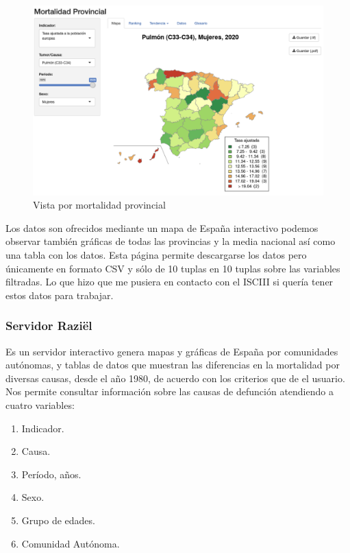 \begin{figure}[]
	\centering
	\includegraphics[scale=0.5]{doc/logos/imgs/ariadna2.png}
	\caption{ \cite{ariadna} Vista por mortalidad provincial }
    \label{fig:worst_f_value}
\end{figure}

Los datos son ofrecidos mediante un mapa de España interactivo podemos observar también gráficas de todas las
provincias y la media nacional así como una tabla con los datos. Esta página permite descargarse los datos pero
únicamente en formato CSV y sólo de 10 tuplas en 10 tuplas sobre las variables filtradas. Lo que hizo que me pusiera en 
contacto con el ISCIII si quería tener estos datos para trabajar.

\subsubsection{Servidor Raziël}
Es un servidor interactivo genera mapas y gráficas de España por comunidades autónomas, y tablas de datos que muestran 
las diferencias en la mortalidad por diversas causas, desde el año 1980, de acuerdo con los criterios que de el usuario.
Nos permite consultar información sobre las causas de defunción atendiendo a cuatro variables:
\begin{enumerate}
    \item Indicador.
    \item Causa.
    \item Período, años.
    \item Sexo.
    \item Grupo de edades.
    \item Comunidad Autónoma.
  \end{enumerate}


